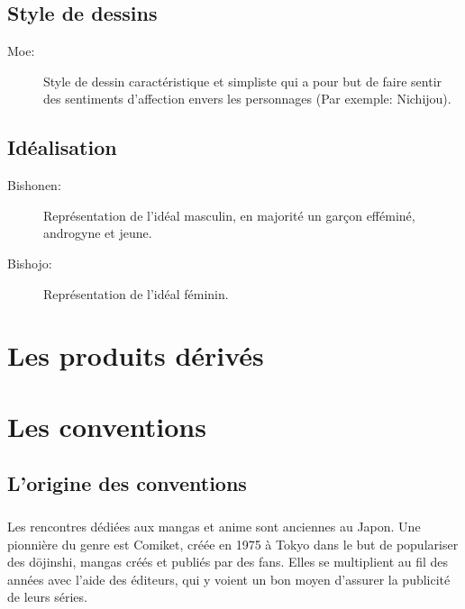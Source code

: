 \section{Style de dessins}

\begin{description}
	\item[Moe:] Style de dessin caractéristique et simpliste qui a pour but de
		faire sentir des sentiments d'affection envers les personnages (Par
		exemple: Nichijou).
\end{description}

\section{Idéalisation}

\begin{description}
	\item[Bishonen:] Représentation de l'idéal masculin, en majorité un garçon
		efféminé, androgyne et jeune.
	\item[Bishojo:] Représentation de l'idéal féminin.
\end{description}

\chapter{Les produits dérivés}

\chapter{Les conventions}
\section{L'origine des conventions}
\paragraph{}
Les rencontres dédiées aux mangas et anime sont anciennes au Japon. Une pionnière du genre est Comiket, créée en 1975 à Tokyo dans le but de populariser des d\=ojinshi, mangas créés et publiés par des fans. Elles se multiplient au fil des années avec l’aide des éditeurs, qui y voient un bon moyen d’assurer la publicité de leurs séries.
